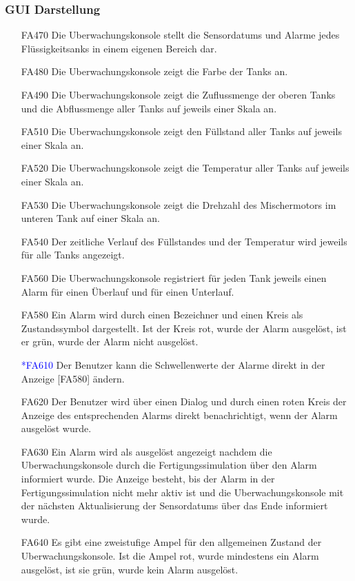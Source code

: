 \documentclass[parskip=full]{scrartcl}
\begin{document}
\subsubsection{GUI Darstellung}
\begin{enumerate}
  \item[FA470] Die \gls{Uberwachungskonsole} stellt die \glspl{Sensordatum} und Alarme jedes Flüssigkeitsanks in einem eigenen Bereich dar.
  \item[FA480] Die \gls{Uberwachungskonsole} zeigt die Farbe der Tanks an.
  \item[FA490] Die \gls{Uberwachungskonsole} zeigt die Zuflussmenge der oberen Tanks und die Abflussmenge aller Tanks auf jeweils einer Skala an.
  \item[FA510] Die \gls{Uberwachungskonsole} zeigt den Füllstand aller Tanks auf jeweils einer Skala an.
  \item[FA520] Die \gls{Uberwachungskonsole} zeigt die Temperatur aller Tanks auf jeweils einer Skala an.
  \item[FA530] Die \gls{Uberwachungskonsole} zeigt die Drehzahl des Mischermotors im unteren Tank auf einer Skala an.
  \item[FA540] Der zeitliche Verlauf des Füllstandes und der Temperatur wird jeweils für alle Tanks angezeigt.
  \item[FA560] Die \gls{Uberwachungskonsole} registriert für jeden Tank jeweils einen Alarm für einen Überlauf und für einen Unterlauf.
  \item[FA580] Ein Alarm wird durch einen Bezeichner und einen Kreis als Zustandssymbol dargestellt. Ist der Kreis rot, wurde der Alarm ausgelöst, ist er grün, wurde der Alarm nicht ausgelöst.
  \item[\textcolor{blue}{*FA610}] Der Benutzer kann die Schwellenwerte der Alarme direkt in der Anzeige [FA580] ändern.
  \item[FA620] Der Benutzer wird über einen Dialog und durch einen roten Kreis der Anzeige des entsprechenden Alarms direkt benachrichtigt, wenn der Alarm ausgelöst wurde.
  \item[FA630] Ein Alarm wird als ausgelöst angezeigt nachdem die \gls{Uberwachungskonsole} durch die \gls{Fertigungssimulation} \"uber den Alarm informiert wurde. Die Anzeige besteht, bis der Alarm in der
    \gls{Fertigungssimulation} nicht mehr aktiv ist und die \gls{Uberwachungskonsole} mit der nächsten Aktualisierung der \glspl{Sensordatum} über das Ende informiert wurde.
  \item[FA640] Es gibt eine zweistufige Ampel für den allgemeinen Zustand der \gls{Uberwachungskonsole}. Ist die Ampel rot, wurde mindestens ein Alarm ausgelöst, ist sie grün, wurde kein Alarm ausgelöst.

\end{enumerate}
\end{document}

